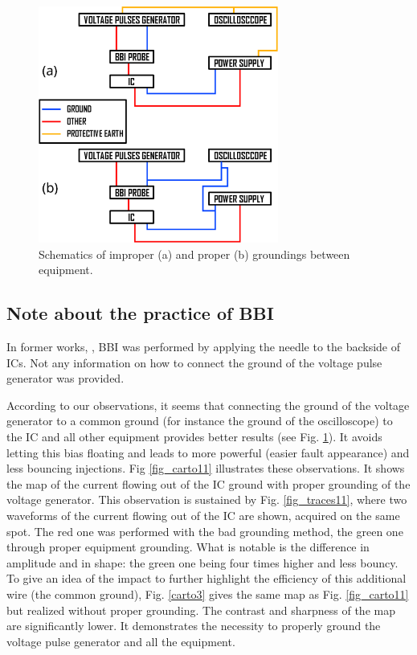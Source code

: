 \documentclass[10pt, conference, compsocconf]{IEEEtran}
\begin{document}
\begin{figure}[!ht]
\centering
\includegraphics[width=3.1in]{drawing_grounding.eps}
\caption{Schematics of improper (a) and proper (b) groundings between equipment.}
\label{oscillo}
\end{figure}

\subsection{Note about the practice of BBI}
In former works, \cite{pmaurine2012, ktobich2013, nbb2016, oflynn2020, japBBI, mybbi}, BBI was performed by applying the needle to the backside of ICs. Not any information on how to connect the ground of the voltage pulse generator was provided.

According to our observations, it seems that connecting the ground of the voltage generator to a common ground (for instance the ground of the oscilloscope) to the IC and all other equipment provides better results (see Fig. \ref{oscillo}). It avoids letting this bias floating and leads to more powerful (easier fault appearance) and less bouncing injections. Fig \ref{fig_carto11} illustrates these observations. It shows the map of the current flowing out of the IC ground with proper grounding of the voltage generator. This observation is sustained by Fig. \ref{fig_traces11}, where two waveforms of the current flowing out of the IC are shown, acquired on the same spot. The red one was performed with the bad grounding method, the green one through proper equipment grounding. What is notable is the difference in amplitude and in shape: the green one being four times higher and less bouncy. To give an idea of the impact to further highlight the efficiency of this additional wire (the common ground), Fig. \ref{carto3} gives the same map as Fig. \ref{fig_carto11} but realized without proper grounding. The contrast and sharpness of the map are significantly lower. It demonstrates the necessity to properly ground the voltage pulse generator and all the equipment.
\end{document}
